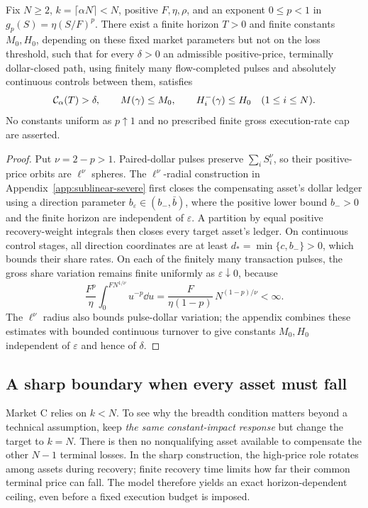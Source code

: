 \documentclass[review,hidelinks,onefignum,onetabnum]{siamonline250211}
\begin{document}
\begin{theorem}\label{thm:sublinear-severe}
Fix $N\ge2$, $k=\lceil\alpha N\rceil<N$, positive $F,\eta,\rho$,
and an exponent $0\le p<1$ in
$g_p(S)=\eta(S/F)^p$. There exist a finite horizon $T>0$
and finite constants $M_0,H_0$, depending on these fixed
market parameters but not on the loss threshold, such that for
every $\delta>0$ an admissible positive-price,
terminally dollar-closed path, using finitely many
flow-completed pulses and absolutely continuous controls
between them, satisfies
\[
\mathcal{C}_\alpha(T)>\delta,\qquad
M(\gamma)\le M_0,\qquad
H_i^-(\gamma)\le H_0\quad(1\le i\le N).
\]
No constants uniform as $p\uparrow1$ and no prescribed
finite gross execution-rate cap are asserted.
\end{theorem}
\begin{proof}
Put $\nu=2-p>1$. Paired-dollar pulses preserve
$\sum_iS_i^\nu$, so their positive-price orbits are
$\ell^\nu$ spheres. The $\ell^\nu$-radial construction in
Appendix~\ref{app:sublinear-severe} first closes the
compensating asset's dollar ledger using a direction
parameter $b_\varepsilon\in(b_-,\bar b)$, where the
positive lower bound $b_->0$ and the finite horizon
are independent of $\varepsilon$. A partition by equal
positive recovery-weight integrals then closes every
target asset's ledger. On continuous control stages,
all direction coordinates are at least
$d_*=\min\{c,b_-\}>0$, which bounds their share rates.
On each of the finitely many transaction pulses,
the gross share variation remains finite uniformly
as $\varepsilon\downarrow0$, because
\[
\frac{F^p}{\eta}\int_0^{FN^{1/\nu}}u^{-p}\dd u
=\frac{F}{\eta(1-p)}\,N^{(1-p)/\nu}<\infty.
\]
The $\ell^\nu$ radius also bounds pulse-dollar variation;
the appendix combines these estimates with bounded
continuous turnover to give constants $M_0,H_0$
independent of $\varepsilon$ and hence of $\delta$.
\end{proof}

\subsection{A sharp boundary when every asset must fall}\label{sec:allcoverage}
Market C relies on $k<N$. To see why the breadth condition matters beyond a technical assumption, keep \emph{the same constant-impact response} but change the target to $k=N$. There is then no nonqualifying asset available to compensate the other $N-1$ terminal losses. In the sharp construction, the high-price role rotates among assets during recovery; finite recovery time limits how far their common terminal price can fall. The model therefore yields an exact horizon-dependent ceiling, even before a fixed execution budget is imposed.
\end{document}
